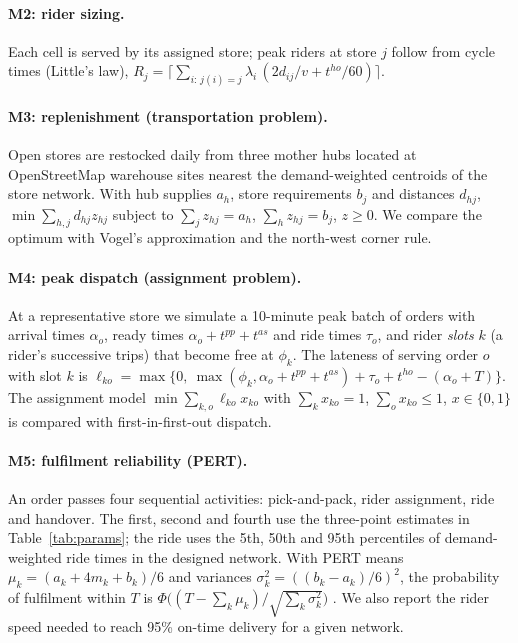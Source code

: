 \paragraph{M2: rider sizing.} Each cell is served by its assigned store; peak riders at store $j$ follow from cycle times (Little's law),
$R_j = \big\lceil \sum_{i:\,j(i)=j} \lambda_i \,(2 d_{ij}/v + t^{ho}/60) \big\rceil$.

\paragraph{M3: replenishment (transportation problem).} Open stores are restocked daily from three mother hubs located at OpenStreetMap warehouse sites nearest the demand-weighted centroids of the store network. With hub supplies $a_h$, store requirements $b_j$ and distances $d_{hj}$,
$\min \sum_{h,j} d_{hj} z_{hj}$ subject to $\sum_j z_{hj} = a_h$, $\sum_h z_{hj} = b_j$, $z\ge 0$. We compare the optimum with Vogel's approximation and the north-west corner rule.

\paragraph{M4: peak dispatch (assignment problem).} At a representative store we simulate a 10-minute peak batch of orders with arrival times $\alpha_o$, ready times $\alpha_o + t^{pp} + t^{as}$ and ride times $\tau_o$, and rider \emph{slots} $k$ (a rider's successive trips) that become free at $\phi_k$. The lateness of serving order $o$ with slot $k$ is $\ell_{ko} = \max\{0,\ \max(\phi_k, \alpha_o + t^{pp} + t^{as}) + \tau_o + t^{ho} - (\alpha_o + T)\}$. The assignment model $\min \sum_{k,o} \ell_{ko} x_{ko}$ with $\sum_k x_{ko}=1$, $\sum_o x_{ko}\le 1$, $x\in\{0,1\}$ is compared with first-in-first-out dispatch.

\paragraph{M5: fulfilment reliability (PERT).} An order passes four sequential activities: pick-and-pack, rider assignment, ride and handover. The first, second and fourth use the three-point estimates in Table~\ref{tab:params}; the ride uses the 5th, 50th and 95th percentiles of demand-weighted ride times in the designed network. With PERT means $\mu_k = (a_k + 4m_k + b_k)/6$ and variances $\sigma^2_k = ((b_k-a_k)/6)^2$, the probability of fulfilment within $T$ is $\Phi\big((T-\sum_k\mu_k)/\sqrt{\sum_k \sigma_k^2}\big)$ \citep{malcolm1959}. We also report the rider speed needed to reach 95\% on-time delivery for a given network.
